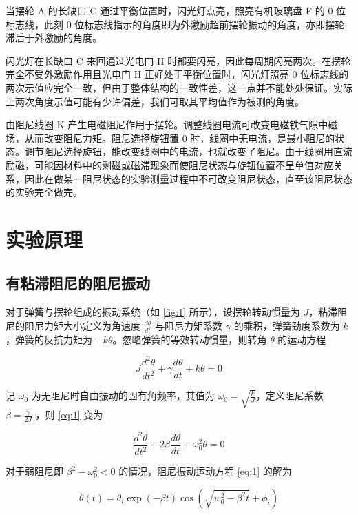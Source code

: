 \documentclass[12pt,a4paper]{amsart}
\begin{document}
当摆轮 A 的长缺口 C 通过平衡位置时，闪光灯点亮，照亮有机玻璃盘 F 的 0 位标志线，此刻 0 位标志线指示的角度即为外激励超前摆轮振动的角度，亦即摆轮滞后于外激励的角度。

闪光灯在长缺口 C 来回通过光电门 H 时都要闪亮，因此每周期闪亮两次。在摆轮完全不受外激励作用且光电门 H 正好处于平衡位置时，闪光灯照亮 0 位标志线的两次示值应完全一致，但由于整体结构的一致性差，这一点并不能处处保证。实际上两次角度示值可能有少许偏差，我们可取其平均值作为被测的角度。

由阻尼线圈 K 产生电磁阻尼作用于摆轮。调整线圈电流可改变电磁铁气隙中磁场，从而改变阻尼力矩。阻尼选择旋钮置 0 时，线圈中无电流，是最小阻尼的状态。调节阻尼选择旋钮，能改变线圈中的电流，也就改变了阻尼。由于线圈用直流励磁，可能因材料中的剩磁或磁滞现象而使阻尼状态与旋钮位置不呈单值对应关系，因此在做某一阻尼状态的实验测量过程中不可改变阻尼状态，直至该阻尼状态的实验完全做完。

\section{实验原理}

\subsection{有粘滞阻尼的阻尼振动}

对于弹簧与摆轮组成的振动系统（如 \ref{fig:1} 所示），设摆轮转动惯量为 $J$，粘滞阻尼的阻尼力矩大小定义为角速度 $\frac{d\theta}{dt}$ 与阻尼力矩系数 $\gamma$ 的乘积，弹簧劲度系数为 $k$，弹簧的反抗力矩为 $-k\theta$。忽略弹簧的等效转动惯量，则转角 $\theta$ 的运动方程

\begin{equation}
	J\frac{d^2\theta}{dt^2} + \gamma\frac{d\theta}{dt} + k\theta = 0 \label{eq:1}
\end{equation}

记 $\omega_0$ 为无阻尼时自由振动的固有角频率，其值为 $\omega_0 = \sqrt{\frac{k}{J}}$，定义阻尼系数 $\beta = \frac{\gamma}{2J}$ ，则 \ref{eq:1} 变为

\begin{equation}
	\frac{d^2\theta}{dt^2} + 2\beta\frac{d\theta}{dt} + \omega_0^2\theta = 0 \label{eq:2}
\end{equation}

对于弱阻尼即 $\beta^2-\omega_0^2<0$ 的情况，阻尼振动运动方程 \ref{eq:1} 的解为

\begin{equation}
	\theta(t) = \theta_i \exp(-\beta t)\cos(\sqrt{w_0^2-\beta^2 t} + \phi_i) \label{eq:3}
\end{equation}
\end{document}
